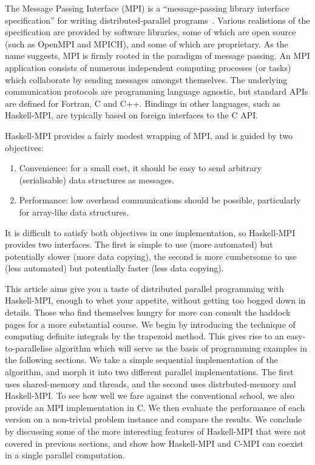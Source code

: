 \documentclass{tmr}
\begin{document}
The Message Passing Interface (MPI) is a ``message-passing library interface specification''
for writing distributed-parallel programs~\cite{mpi-report}. Various realistions of the
specification are provided by software libraries, some of which are open source
(such as OpenMPI and MPICH), and some of which are proprietary.
As the name suggests, MPI is firmly rooted in the paradigm of message passing.
An MPI application consists of numerous independent computing processes (or tasks)
which collaborate by sending messages amongst themselves.
The underlying communication protocols are programming language agnostic, but standard APIs are
defined for Fortran, C and C++. Bindings in other languages, such as Haskell-MPI,
are typically based on foreign interfaces to the C API.

Haskell-MPI provides a fairly modest wrapping of MPI, and is guided by two objectives:
\begin{enumerate}
 \item Convenience: for a small cost, it should be easy to send arbitrary (serialisable)
data structures as messages.
 \item Performance: low overhead communications should be possible,
particularly for array-like data structures.
\end{enumerate}
It is difficult to satisfy both objectives in one implementation, so Haskell-MPI provides two interfaces.
The first is simple to use (more automated) but potentially slower (more data copying), the second
is more cumbersome to use (less automated) but potentially faster (less data copying).

This article aims give you a taste of distributed parallel programming with Haskell-MPI, enough to
whet your appetite, without getting too bogged down in details. Those who find themselves hungry for
more can consult the haddock pages for a more substantial course.
We begin by introducing the technique of computing definite integrals by the trapezoid method.
This gives rise to an easy-to-parallelise algorithm which will serve as the
basis of programming examples in the following sections. We take a simple sequential implementation
of the algorithm, and morph it into two different parallel implementations.
The first uses shared-memory and threads, and the second uses distrbuted-memory and Haskell-MPI.
To see how well we fare against the conventional school, we also provide an MPI implementation in C.
We then evaluate the performance of each version on a non-trivial problem instance and compare the results.
We conclude by discussing some of the more interesting features of Haskell-MPI that were not covered in
previous sections, and show how Haskell-MPI and C-MPI can coexist in a single parallel computation.
\end{document}
